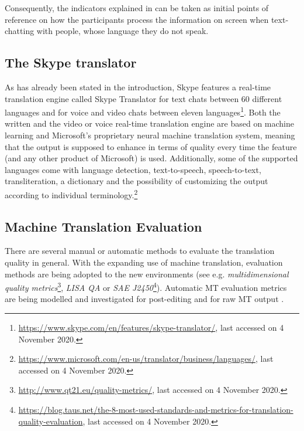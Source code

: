 \documentclass[output=paper,colorlinks,citecolor=brown]{langscibook}
\begin{document}
    Consequently, the indicators explained in  can be taken as initial points of reference on how the participants process the information on screen when text-chatting with people, whose language they do not speak.
    
    
    \subsection{The Skype translator}
    \label{subsec:Skype-Translator}
    
    As has already been stated in the introduction, Skype features a real-time translation engine called Skype Translator for text chats between 60 different languages and for voice and video chats between eleven languages\footnote{\url{https://www.skype.com/en/features/skype-translator/}, last accessed on 4 November 2020.}. Both the written and the video or voice real-time translation engine are based on machine learning and Microsoft's proprietary neural machine translation system, meaning that the output is supposed to enhance in terms of quality every time the feature (and any other product of Microsoft) is used.  Additionally, some of the supported languages come with language detection, text-to-speech, speech-to-text, transliteration, a dictionary and the possibility of customizing the output according to individual terminology.\footnote{\url{https://www.microsoft.com/en-us/translator/business/languages/}, last accessed on 4 November 2020.}
    

    \subsection{Machine Translation Evaluation}
    \label{subsec:MT-evaluation}


    There are several manual or automatic methods to evaluate the translation quality in general. With the expanding use of machine translation, evaluation methods are being adopted to the new environments (see e.g. \textit{multidimensional quality metrics}\footnote{\url{http://www.qt21.eu/quality-metrics/}, last accessed on 4 November 2020.}, \textit{LISA QA} or \textit{SAE J2450}\footnote{\url{https://blog.taus.net/the-8-most-used-standards-and-metrics-for-translation-quality-evaluation}, last accessed on 4 November 2020.}). Automatic MT evaluation metrics are being modelled and investigated for post-editing \citep[2]{vardaro_translation_2019} and for raw MT output \citep{doherty_assessing_2014}.
 
\end{document}
